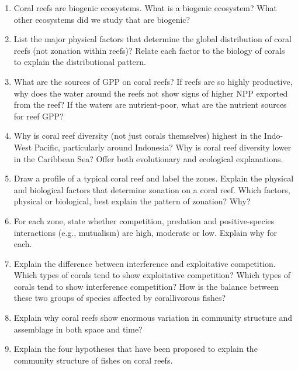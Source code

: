 \documentclass[nofonts, letterpaper]{tufte-handout}
\begin{document}
\begin{enumerate}
\item
  Coral reefs are biogenic ecosystems. What is a biogenic ecosystem?
  What other ecosystems did we study that are biogenic?

\item
  List the major physical factors that determine the global distribution
  of coral reefs (not zonation within reefs)? Relate each factor to the
  biology of corals to explain the distributional pattern.
\item
  What are the sources of GPP on coral reefs? If reefs are so highly
  productive, why does the water around the reefs not show signs of
  higher NPP exported from the reef? If the waters are nutrient-poor,
  what are the nutrient sources for reef GPP?
\item
  Why is coral reef diversity (not just corals themselves) highest in
  the Indo-West Pacific, particularly around Indonesia? Why is coral
  reef diversity lower in the Caribbean Sea? Offer both evolutionary and
  ecological explanations.
\item
  Draw a profile of a typical coral reef and label the zones. Explain
  the physical and biological factors that determine zonation on a coral
  reef. Which factors, physical or biological, best explain the pattern
  of zonation? Why?
\item
  For each zone, state whether competition, predation and
  positive-species interactions (e.g., mutualism) are high, moderate or
  low. Explain why for each.
\item
  Explain the difference between interference and exploitative
  competition. Which types of corals tend to show exploitative
  competition? Which types of corals tend to show interference
  competition? How is the balance between these two groups of species
  affected by corallivorous fishes?
\item
  Explain why coral reefs show enormous variation in community structure
  and assemblage in both space and time?
\item
  Explain the four hypotheses that have been proposed to explain the
  community structure of fishes on coral reefs.
\end{enumerate}
\end{document}
